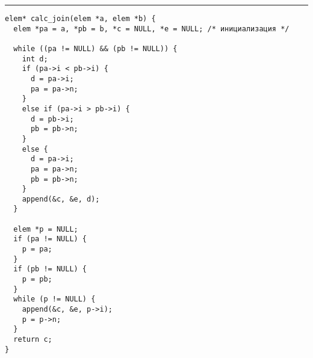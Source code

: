 \documentclass{article}
\begin{document}
\lstset{language = C,
    extendedchars = \true,
    keepspaces = true,
    breaklines=true,
    frame=lines}
\hrule
\begin{lstlisting}[title=\textbf {Алгоритм 1.5} Вычисление объединения слиянием]
elem* calc_join(elem *a, elem *b) {
  elem *pa = a, *pb = b, *c = NULL, *e = NULL; /* инициализация */

  while ((pa != NULL) && (pb != NULL)) {
    int d;
    if (pa->i < pb->i) {
      d = pa->i;
      pa = pa->n;
    }
    else if (pa->i > pb->i) {
      d = pb->i;
      pb = pb->n;
    }
    else {
      d = pa->i;
      pa = pa->n;
      pb = pb->n;
    }
    append(&c, &e, d);
  }

  elem *p = NULL;
  if (pa != NULL) {
    p = pa;
  }
  if (pb != NULL) {
    p = pb;
  }
  while (p != NULL) {
    append(&c, &e, p->i);
    p = p->n;
  }
  return c;
}
\end{lstlisting}
\end{document}
